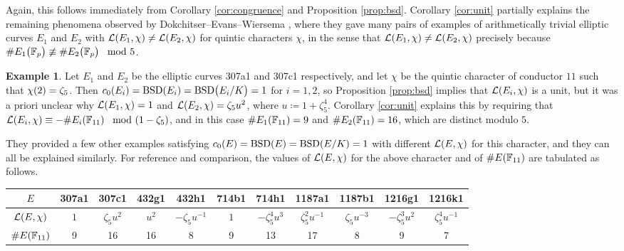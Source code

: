 \documentclass{article}
\theoremstyle{plain}
\theoremstyle{definition}
\newtheorem{example}[n]{Example}
\newcommand{\BSD}{\operatorname{BSD}}
\newcommand{\FF}{\mathbb{F}}
\newcommand{\LLL}{\mathcal{L}}
\newcommand{\br}{\!\del}
\begin{document}
Again, this follows immediately from Corollary \ref{cor:congruence} and Proposition \ref{prop:bsd}. Corollary \ref{cor:unit} partially explains the remaining phenomena observed by Dokchitser--Evans--Wiersema \cite[Example 44]{DEW21}, where they gave many pairs of examples of arithmetically trivial elliptic curves $ E_1 $ and $ E_2 $ with $ \LLL\br{E_1, \chi} \ne \LLL\br{E_2, \chi} $ for quintic characters $ \chi $, in the sense that $ \LLL\br{E_1, \chi} \ne \LLL\br{E_2, \chi} $ precisely because $ \#E_1\br{\FF_p} \not\equiv \#E_2\br{\FF_p} \mod 5 $.

\begin{example}
Let $ E_1 $ and $ E_2 $ be the elliptic curves 307a1 and 307c1 respectively, and let $ \chi $ be the quintic character of conductor $ 11 $ such that $ \chi\br{2} = \zeta_5 $. Then $ c_0\br{E_i} = \BSD\br{E_i} = \BSD\br{E_i / K} = 1 $ for $ i = 1, 2 $, so Proposition \ref{prop:bsd} implies that $ \LLL\br{E_i, \chi} $ is a unit, but it was a priori unclear why $ \LLL\br{E_1, \chi} = 1 $ and $ \LLL\br{E_2, \chi} = \zeta_5u^2 $, where $ u \coloneqq 1 + \zeta_5^4 $. Corollary \ref{cor:unit} explains this by requiring that $ \LLL\br{E_i, \chi} \equiv -\#E_i\br{\FF_{11}} \mod \br{1 - \zeta_5} $, and in this case $ \#E_1\br{\FF_{11}} = 9 $ and $ \#E_2\br{\FF_{11}} = 16 $, which are distinct modulo $ 5 $.

They provided a few other examples satisfying $ c_0\br{E} = \BSD\br{E} = \BSD\br[0]{E / K} = 1 $ with different $ \LLL\br{E, \chi} $ for this character, and they can all be explained similarly. For reference and comparison, the values of $ \LLL\br{E, \chi} $ for the above character and of $ \#E\br{\FF_{11}} $ are tabulated as follows.

\vspace{0.2cm}

\begin{tabular}{|c|cc|cc|cc|cc|cc|}
\hline
$ E $ & 307a1 & 307c1 & 432g1 & 432h1 & 714b1 & 714h1 & 1187a1 & 1187b1 & 1216g1 & 1216k1 \\
\hline
$ \LLL\br{E, \chi} $ & $ 1 $ & $ \zeta_5u^2 $ & $ u^2 $ & $ -\zeta_5u^{-1} $ & $ 1 $ & $ -\zeta_5^4u^3 $ & $ \zeta_5^2u^{-1} $ & $ \zeta_5u^{-3} $ & $ -\zeta_5^3u^2 $ & $ \zeta_5^4u^{-1} $ \\
\hline
$ \#E\br{\FF_{11}} $ & 9 & 16 & 16 & 8 & 9 & 13 & 17 & 8 & 9 & 7 \\
\hline
\end{tabular}
\end{example}
\end{document}
